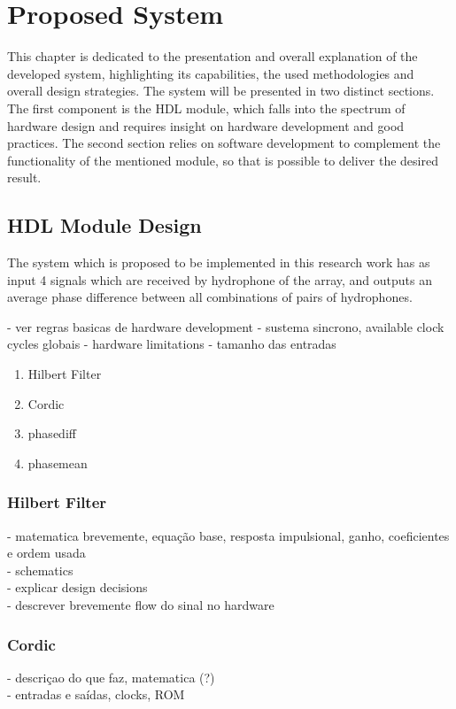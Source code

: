 \chapter{Proposed System} \label{chap:proposed_sys}

This chapter is dedicated to the presentation and overall explanation of the developed system, highlighting its capabilities, the used methodologies and overall design strategies. 
The system will be presented in two distinct sections. The first component is the HDL module, which falls into the spectrum of hardware design and requires insight on hardware development and good practices. The second section relies on software development to complement the functionality of the mentioned module, so that is possible to deliver the desired result.

\section{HDL Module Design}

The system which is proposed to be implemented in this research work has as input 4 signals which are received by  hydrophone of the array, and outputs an average phase difference between all combinations of pairs of hydrophones. 

- ver regras basicas de hardware development
- sustema sincrono, available clock cycles globais
- hardware limitations
- tamanho das entradas


\begin{enumerate}
	\item Hilbert Filter
	\item Cordic
	\item phasediff
	\item phasemean
\end{enumerate}

\subsection{Hilbert Filter}
- matematica brevemente, equação base, resposta impulsional, ganho, coeficientes e ordem usada
\\
- schematics 
\\
- explicar design decisions
\\
- descrever brevemente flow do sinal no hardware

\subsection{Cordic}
- descriçao do que faz, matematica (?)
\\
- entradas e saídas, clocks, ROM

